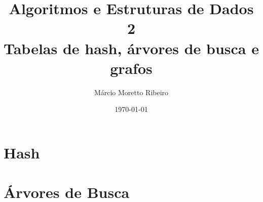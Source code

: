\documentclass[a4paper, 12pt]{book} %
\title{Algoritmos e Estruturas de Dados 2\\ Tabelas de hash, árvores de busca e grafos}
\author{Márcio Moretto Ribeiro}
\date{\today} %
\begin{document}
\newenvironment{extra}[1]
{
    \section{#1*}
     \begin{mdframed}[
        linewidth=0pt,
        backgroundcolor=blue!5,
    ]
}
{
    \end{mdframed}
}

\maketitle
\tableofcontents




\part{Hash}





\part{Árvores de Busca}





\appendix
\end{document}
